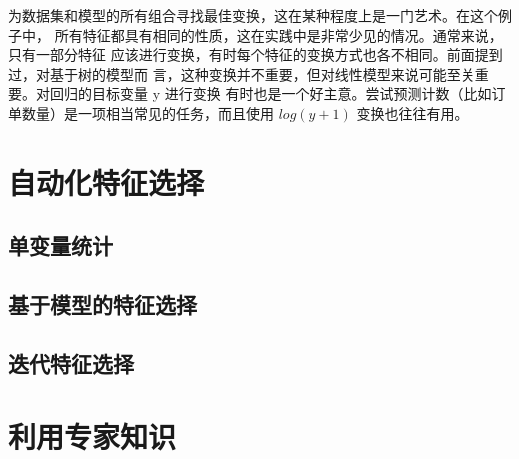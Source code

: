 为数据集和模型的所有组合寻找最佳变换，这在某种程度上是一门艺术。在这个例子中，
所有特征都具有相同的性质，这在实践中是非常少见的情况。通常来说，只有一部分特征
应该进行变换，有时每个特征的变换方式也各不相同。前面提到过，对基于树的模型而
言，这种变换并不重要，但对线性模型来说可能至关重要。对回归的目标变量 y 进行变换
有时也是一个好主意。尝试预测计数（比如订单数量）是一项相当常见的任务，而且使用
$log(y + 1)$ 变换也往往有用。

\section{自动化特征选择}
\subsection{单变量统计}
\subsection{基于模型的特征选择}
\subsection{迭代特征选择}
\section{利用专家知识}
